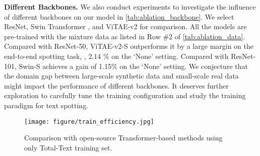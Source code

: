 \documentclass[10pt,twocolumn,letterpaper]{article}
\begin{document}
\noindent \textbf{Different Backbones.} We also conduct experiments to investigate the influence of different backbones on our model in \cref{tab:ablation_backbone}. We select ResNet, Swin Transformer \cite{liu2021swin}, and ViTAE-v2 \cite{zhang2022vitaev2} for comparison. All the models are pre-trained with the mixture data as listed in Row \#2 of \cref{tab:ablation_data}. Compared with ResNet-50, ViTAE-v2-S outperforms it by a large margin on the end-to-end spotting task, \ie, 2.14 \% on the `None' setting. Compared with ResNet-101, Swin-S achieves a gain of 1.15\% on the ‘None’ setting. We conjecture that the domain gap between large-scale synthetic data and small-scale real data might impact the performance of different backbones. It deserves further exploration to carefully tune the training configuration and study the training paradigm for text spotting.

\begin{figure}[!t]
    \centering
    \texttt{[image: figure/train\_efficiency.jpg]}
    \caption{Comparison with open-source Transformer-based methods using only Total-Text training set.}
    \label{fig:train_eff}
\end{figure}

\begin{table}[!t]
    \centering
    \setlength{\tabcolsep}{4pt}
\caption{The influence of different backbones. Mem.: the peak memory of batching two images on one GPU during pre-training.}
\label{tab:ablation_backbone}
\vspace{-3mm}
\end{table}
\end{document}
